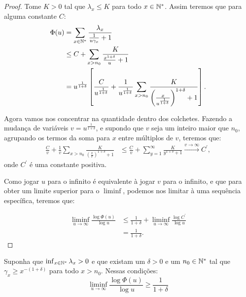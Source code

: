 \begin{proof}
  Tome $K > 0$ tal que $\lambda_x \leq K$ para todo $x \in {\mathbb{N^*}}$. Assim
  teremos que para alguma constante $C$:
  \begin{align*}
    \Phi(u) &= \sum_{x \in {\mathbb{N^*}}} \frac{\lambda_x}{\frac{1}{u\gamma_x} +
      1}\\
    &\leq C + \sum_{x > n_0} \frac{K}{\frac{x^{1+\delta}}{u} + 1}\\
    &=u^{\frac{1}{1+\delta}} \left[
      \frac{C}{u^{\frac{1}{1+\delta}}} +
      \frac{1}{u^{\frac{1}{1+\delta}}} \sum_{x > n_0} \frac{K}{
        \left( \frac{x}{u^{\frac{1}{1+\delta}}}  \right)^{1+\delta}
        + 1
      }
    \right].
  \end{align*}

  Agora vamos nos concentrar na quantidade dentro dos
  colchetes. Fazendo a mudança de variáveis $v =
  u^{\frac{1}{1+\delta}}$, e supondo que $v$ seja um inteiro maior que
  $n_0$, agrupando os termos da soma para $x$ entre múltiplos de $v$,
  teremos que:
  \begin{align*}
    \frac{C}{v} + \frac{1}{v} \sum_{x > n_0} \frac{K}{ \left(
        \frac{x}{v} \right)^{1+\delta} + 1 }
    &\leq
    \frac{C}{v} + \sum_{y=1}^{\infty} \frac{K}{y^{1+\delta} + 1}
    \xrightarrow{v \to \infty} C^\prime,
  \end{align*}
  onde $C^\prime$ é uma constante positiva.

  Como jogar $u$ para o infinito é equivalente à jogar $v$ para o
  infinito, e que para obter um limite superior para o $\liminf$,
  podemos  nos limitar à uma sequência específica, teremos que:

  \begin{align*}
    \liminf_{u \to \infty} \frac{\log \Phi(u)}{\log u} &\leq
    \frac{1}{1+\delta} + \liminf_{u \to \infty} 
    \frac{\log{C^\prime}}{\log u}\\
    &= \frac{1}{1+\delta}.
  \end{align*}
\end{proof}

\begin{proposicao}
  Suponha que $\inf_{x\in{\mathbb{N^*}}}\lambda_x  > 0$ e que existam um
  $\delta>0$ e um $n_0 \in {\mathbb{N^*}}$ tal que $\gamma_x \geq x^{-(1+\delta)}$
  para todo $x > n_0$. Nessas condições:
  \begin{equation}
    \liminf_{u \to \infty} \frac{\log \Phi(u)}{\log u}  \geq \frac{1}{1+\delta}
  \end{equation}
\end{proposicao}

